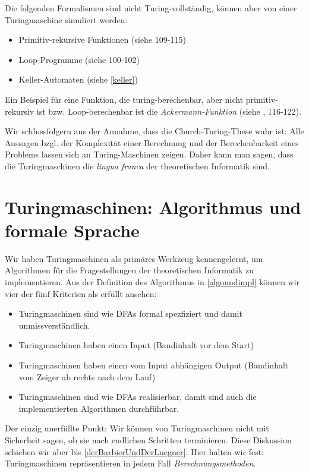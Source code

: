 Die folgenden Formalismen sind nicht Turing-vollständig,
können aber von einer Turingmaschine simuliert werden:
\begin{itemize}
    \item Primitiv-rekursive Funktionen (siehe \cite{schoening} 109-115)
    \item Loop-Programme (siehe \cite{schoening} 100-102)
    \item Keller-Automaten (siehe \autoref{keller})
\end{itemize}
Ein Beispiel für eine Funktion,
die turing-berechenbar, aber nicht primitiv-rekursiv ist bzw. Loop-berechenbar 
ist die \emph{Ackermann-Funktion} (siehe \cite{schoening}, 116-122).

Wir schlussfolgern aus der Annahme,
dass die Church-Turing-These wahr ist:
Alle Aussagen bzgl. der Komplexität einer Berechnung und der Berechenbarkeit eines Problems
lassen sich an Turing-Maschinen zeigen.
Daher kann man sagen,
dass die Turingmaschinen die \emph{lingua franca} der theoretischen Informatik sind.

\section{Turingmaschinen: Algorithmus und formale Sprache}
Wir haben Turingmaschinen als primäres Werkzeug kennengelernt,
um Algorithmen für die Fragestellungen der theoretischen Informatik zu implementieren.
Aus der Definition des Algorithmus in \autoref{algoundimpl}
können wir vier der fünf Kriterien als erfüllt ansehen:
\begin{itemize}
    \item Turingmaschinen sind wie DFAs formal spezfiziert und damit unmissverständlich.
    \item Turingmaschinen haben einen Input (Bandinhalt vor dem Start)
    \item Turingmaschinen haben einen vom Input abhängigen Output 
        (Bandinhalt vom Zeiger ab rechts nach dem Lauf)
    \item Turingmaschinen sind wie DFAs realisierbar,
        damit sind auch die implementierten Algorithmen durchführbar.
\end{itemize}
Der einzig unerfüllte Punkt:
Wir können von Turingmaschinen nicht mit Sicherheit sagen,
ob sie nach endlichen Schritten terminieren.
Diese Diskussion schieben wir aber bis \autoref{derBarbierUndDerLuegner}.
Hier halten wir fest: Turingmaschinen repräsentieren in jedem Fall \emph{Berechnungsmethoden}.

